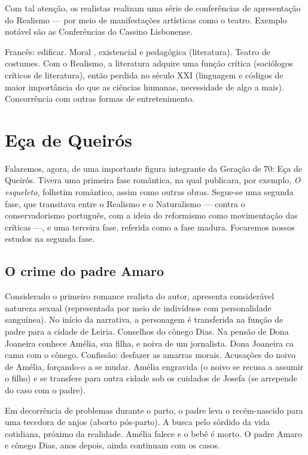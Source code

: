Com tal atenção, os realistas realizam uma série de conferências de apresentação do Realismo — por meio de manifestações artísticas como o teatro. Exemplo notável são as Conferências do Cassino Lisbonense.

Francês: edificar. Moral , existencial e pedagógica (literatura). Teatro de costumes. Com o Realismo, a literatura adquire uma função crítica (sociólogos críticos de literatura), então perdida no século XXI (linguagem e códigos de maior importância do que as ciências humanas, necessidade de algo a mais). Concorrência com outras formas de entretenimento.

\section{Eça de Queirós}

Falaremos, agora, de uma importante figura integrante da Geração de 70: Eça de Queirós. Tivera uma primeira fase romântica, na qual publicara, por exemplo, \textit{O esqueleto}, folhetim romântico, assim como outras obras. Segue-se uma segunda fase, que transitava entre o Realismo e o Naturalismo — contra o conservadorismo português, com a ideia do reformismo como movimentação das críticas —, e uma terceira fase, referida como a fase madura. Focaremos nossos estudos na segunda fase.

\subsection{O crime do padre Amaro}

Considerado o primeiro romance realista do autor, apresenta considerável natureza sexual (representada por meio de indivíduos com personalidade sanguínea). No início da narrativa, a personagem é transferida na função de padre para a cidade de Leiria. Conselhos do cônego Dias. Na pensão de Dona Joaneira conhece Amélia, sua filha, e noiva de um jornalista. Dona Joaneira ca cama com o cônego. Confissão: desfazer as amarras morais. Acusações do noivo de Amélia, forçando-o a se mudar. Amélia engravida (o noivo se recusa a assumir o filho) e se transfere para outra cidade sob os cuidados de Josefa (se arrepende do caso com o padre).

Em decorrência de problemas durante o parto, o padre leva o recém-nascido para uma tecedora de anjos (aborto pós-parto). A busca pelo sórdido da vida cotidiana, próximo da realidade. Amélia falece e o bebê é morto. O padre Amaro e cônego Dias, anos depois, ainda continuam com os casos.

